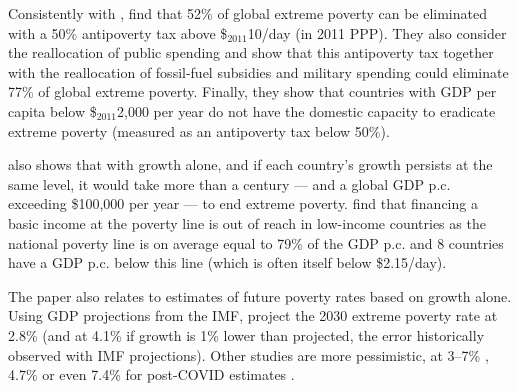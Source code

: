 Consistently with \cite{ravallion_poorer_2010}, \cite{hoy_gasoline_2016} find that 52\% of global extreme poverty can be eliminated with a 50\% antipoverty tax above \$$_\text{2011}$10/day (in 2011 PPP). They also consider the reallocation of public spending and show that this antipoverty tax together with the reallocation of fossil-fuel subsidies and military spending could eliminate 77\% of global extreme poverty. Finally, they show that countries with GDP per capita below \$$_\text{2011}$2,000 per year do not have the domestic capacity to eradicate extreme poverty (measured as an antipoverty tax below 50\%).

\cite{woodward_incrementum_2015} also shows that with growth alone, and if each country's growth persists at the same level, it would take more than a century --- and a global GDP p.c. exceeding \$100,000 per year --- to end extreme poverty. %
\cite{ortiz_universal_2018} find that financing a basic income at the poverty line is out of reach in low-income countries as the national poverty line is on average equal to 79\% of the GDP p.c. and 8 countries have a GDP p.c. below this line (which is often itself below \$2.15/day).

The paper also relates to estimates of future poverty rates based on growth alone. Using GDP projections from the IMF, \cite{karver_mdgs_2012} project the 2030 extreme poverty rate at 2.8\% (and at 4.1\% if growth is 1\% lower than projected, the error historically observed with IMF projections). Other studies are more pessimistic, at 3--7\% \citep{chandy_final_2013,bicaba_can_2017}, 4.7\% \citep{manuel_financing_2018} or even 7.4\% for post-COVID estimates \citep{lakner_how_2022}. 

